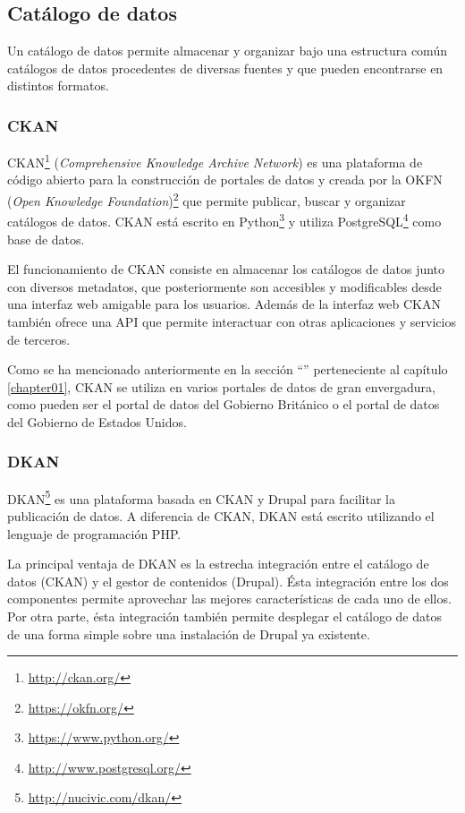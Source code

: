 \subsection{Catálogo de datos}
Un catálogo de datos permite almacenar y organizar bajo una estructura común catálogos de datos procedentes de diversas fuentes y que pueden encontrarse en distintos formatos.


\subsubsection{CKAN}
CKAN\footnote{\url{http://ckan.org/}} (\textit{Comprehensive Knowledge Archive Network}) es una plataforma de código abierto para la construcción de portales de datos y creada por la OKFN (\textit{Open Knowledge Foundation})\footnote{\url{https://okfn.org/}} que permite publicar, buscar y organizar catálogos de datos. CKAN está escrito en Python\footnote{\url{https://www.python.org/}} y utiliza PostgreSQL\footnote{\url{http://www.postgresql.org/}} como base de datos.

El funcionamiento de CKAN consiste en almacenar los catálogos de datos junto con diversos metadatos, que posteriormente son accesibles y modificables desde una interfaz web amigable para los usuarios.  Además de la interfaz web CKAN también ofrece una API que permite interactuar con otras aplicaciones y servicios de terceros.

Como se ha mencionado anteriormente en la sección ``'' perteneciente al capítulo \ref{chapter01}, CKAN se utiliza en varios portales de datos de gran envergadura, como pueden ser el portal de datos del Gobierno Británico o el portal de datos del Gobierno de Estados Unidos.


\subsubsection{DKAN}
DKAN\footnote{\url{http://nucivic.com/dkan/}} es una plataforma basada en CKAN y Drupal para facilitar la publicación de datos.  A diferencia de CKAN, DKAN está escrito utilizando el lenguaje de programación PHP.

La principal ventaja de DKAN es la estrecha integración entre el catálogo de datos (CKAN) y el gestor de contenidos (Drupal).  Ésta integración entre los dos componentes permite aprovechar las mejores características de cada uno de ellos.  Por otra parte, ésta integración también permite desplegar el catálogo de datos de una forma simple sobre una instalación de Drupal ya existente.

